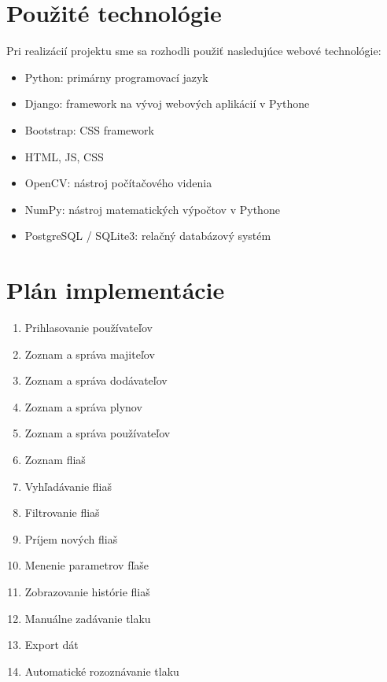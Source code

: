 \documentclass{zah}
\begin{document}
\section{Použité technológie}

Pri realizácií projektu sme sa rozhodli použiť nasledujúce webové technológie:

\begin{itemize}
\item Python: primárny programovací jazyk
\item Django: framework na vývoj webových aplikácií v Pythone
\item Bootstrap: CSS framework
\item HTML, JS, CSS
\item OpenCV: nástroj počítačového videnia
\item NumPy: nástroj matematických výpočtov v Pythone
\item PostgreSQL / SQLite3: relačný databázový systém
\end{itemize}

\section{Plán implementácie}

\begin{enumerate}
	\item Prihlasovanie používateľov
	\item Zoznam a správa majiteľov
	\item Zoznam a správa dodávateľov
	\item Zoznam a správa plynov
	\item Zoznam a správa používateľov
	\item Zoznam fliaš
	\item Vyhľadávanie fliaš
	\item Filtrovanie fliaš
	\item Príjem nových fliaš
	\item Menenie parametrov fľaše
	\item Zobrazovanie histórie fliaš
	\item Manuálne zadávanie tlaku
	\item Export dát
	\item Automatické rozoznávanie tlaku
\end{enumerate}
\end{document}
